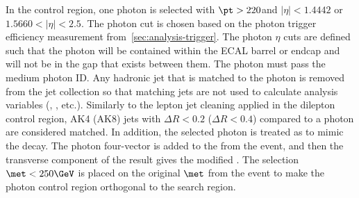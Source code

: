 In the control region, one photon is selected with $\pt > 220$\GeV and $|\eta| < 1.4442$ or $1.5660 < |\eta| < 2.5$.
The photon \pt cut is chosen based on the photon trigger efficiency measurement from~\cref{sec:analysis-trigger}.
The photon $\eta$ cuts are defined such that the photon will be contained within the ECAL barrel or endcap and will not be in the gap that exists between them.
The photon must pass the medium photon ID.
Any hadronic jet that is matched to the photon is removed from the jet collection so that matching jets are not used to calculate analysis variables (\HT, \nj, etc.).
Similarly to the lepton jet cleaning applied in the dilepton control region, AK4 (AK8) jets with $\Delta R < 0.2$ ($\Delta R < 0.4$) compared to a photon are considered matched.
In addition, the selected photon is treated as \met to mimic the \znunu decay.
The photon four-vector is added to the \met from the event, and then the transverse component of the result gives the modified \metphoton.
The selection $\met < 250\GeV$ is placed on the original $\met$ from the event to make the photon control region orthogonal to the search region.

